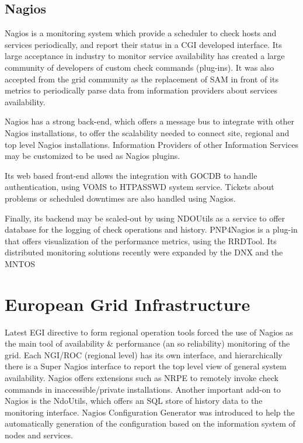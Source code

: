 \subsection{Nagios}
Nagios is a monitoring system which provide a scheduler to check hosts and services periodically, and report their status in a \ac{CGI} developed interface. Its large acceptance in industry to monitor service availability has created a large community of developers of custom check commands (plug-ins). It was also accepted from the grid community as the replacement of \ac{SAM} in front of its metrics to periodically parse data from information providers about services availability.

Nagios has a strong back-end, which offers a message bus to integrate with other Nagios installations, to offer the scalability needed to connect site, regional and top level Nagios installations. Information Providers of other Information Services may be customized to be used as Nagios plugins.

Its web based front-end allows the integration with \ac{GOCDB} to handle authentication, using \ac{VOMS} to HTPASSWD system service. Tickets about problems or scheduled downtimes are also handled using Nagios.

Finally, its backend may be scaled-out by using NDOUtils as a service to offer database for the logging of check operations and history. PNP4Nagios is a plug-in that offers visualization of the performance metrics, using the RRDTool. Its distributed monitoring solutions recently were expanded by the \ac{DNX} and the \ac{MNTOS} \cite{Nagios}

\section{European Grid Infrastructure}
Latest \ac{EGI} directive to form regional operation tools forced the use of Nagios \cite{imamagic2007grid} as the main tool of availability \& performance (an so reliability) monitoring of the grid. Each \ac{NGI}/\ac{ROC} (regional level) has its own interface, and hierarchically there is a Super Nagios interface to report the top level view of general system availability. Nagios offers extensions such as NRPE to remotely invoke check commands in inaccessible/private installations. Another important add-on to Nagios is the NdoUtils, which offers an SQL store of history data to the monitoring interface. Nagios Configuration Generator was introduced to help the automatically generation of the configuration based on the information system of nodes and services.

